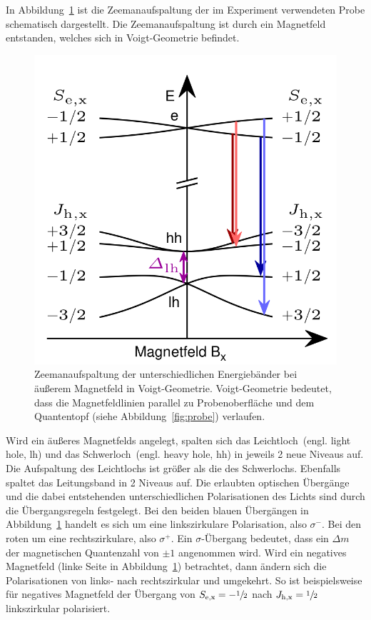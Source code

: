 In Abbildung~\ref{fig:zeeman} ist die Zeemanaufspaltung der im Experiment verwendeten Probe schematisch dargestellt.
Die Zeemanaufspaltung ist durch ein Magnetfeld entstanden, welches sich in Voigt-Geometrie befindet.
\begin{figure}
    \centering
    \includegraphics[scale=0.25]{./Plots/zeeman.png}
    \caption{Zeemanaufspaltung der unterschiedlichen Energiebänder bei äußerem Magnetfeld in Voigt-Geometrie.\cite{felix}
    Voigt-Geometrie bedeutet, dass die Magnetfeldlinien parallel zu Probenoberfläche und dem Quantentopf
    (siehe Abbildung~\ref{fig:probe}) verlaufen.}
    \label{fig:zeeman}
\end{figure}
\FloatBarrier

Wird ein äußeres Magnetfelds angelegt, spalten sich das Leichtloch~(engl. light hole, lh) 
und das Schwerloch~(engl. heavy hole, hh) in jeweils 2 neue Niveaus auf.
Die Aufspaltung des Leichtlochs ist größer als die des Schwerlochs.
Ebenfalls spaltet das Leitungsband in 2 Niveaus auf.
Die erlaubten optischen Übergänge und die dabei entstehenden unterschiedlichen 
Polarisationen des Lichts sind durch die Übergangsregeln festgelegt.
Bei den beiden blauen Übergängen in Abbildung~\ref{fig:zeeman} handelt
es sich um eine linkszirkulare Polarisation, also $\sigma^-$.
Bei den roten um eine rechtszirkulare, also  $\sigma^+$. 
Ein $\sigma$-Übergang bedeutet, dass ein $\Delta m$ der magnetischen Quantenzahl von 
$\pm 1$ angenommen wird.
Wird ein negatives Magnetfeld (linke Seite in Abbildung~\ref{fig:zeeman}) betrachtet,
dann ändern sich die Polarisationen von links- nach rechtszirkular und umgekehrt.
So ist beispielsweise für negatives Magnetfeld der Übergang von $S_\text{e,x} = -\sfrac{1}{2}$
nach $J_\text{h,x} = \sfrac{1}{2}$ linkszirkular polarisiert.

